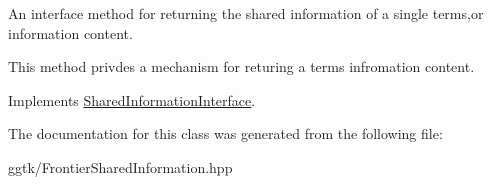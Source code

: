 An interface method for returning the shared information of a single terms,or information content. 

This method privdes a mechanism for returing a term\textquotesingle{}s infromation content. 

Implements \hyperlink{classSharedInformationInterface_aba102c0e44fbc098baef6074f1eb37b6}{Shared\+Information\+Interface}.



The documentation for this class was generated from the following file\+:\begin{DoxyCompactItemize}
\item 
ggtk/Frontier\+Shared\+Information.\+hpp\end{DoxyCompactItemize}
